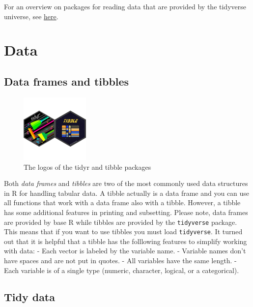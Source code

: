 \documentclass[
  12pt,
  oneside]{book}
\begin{document}
For an overview on packages for reading data that are provided by the tidyverse universe, see \href{https://www.tidyverse.org/packages/\#import}{here}.

\hypertarget{sec:tidy}{%
\section{Data}\label{sec:tidy}}

\hypertarget{data-frames-and-tibbles}{%
\subsection{Data frames and tibbles}\label{data-frames-and-tibbles}}

\begin{figure}
\centering
\includegraphics[width=0.3\textwidth,height=\textheight]{fig/tidyr-tibble-logo.png}
\caption{\label{fig:tidyr-tibble-logo} The logos of the tidyr and tibble packages}
\end{figure}

Both \emph{data frames} and \emph{tibbles} are two of the most commonly used data structures in R for handling tabular data. A tibble actually is a data frame and you can use all functions that work with a data frame also with a tibble. However, a tibble has some additional features in printing and subsetting. Please note, data frames are provided by base R while tibbles are provided by the \texttt{tidyverse} package. This means that if you want to use tibbles you must load \texttt{tidyverse}. It turned out that it is helpful that a tibble has the folllowing features to simplify working with data:
- Each vector is labeled by the variable name.
- Variable names don't have spaces and are not put in quotes.
- All variables have the same length.
- Each variable is of a single type (numeric, character, logical, or a categorical).

\hypertarget{tidy-data}{%
\subsection{Tidy data}\label{tidy-data}}
\end{document}
